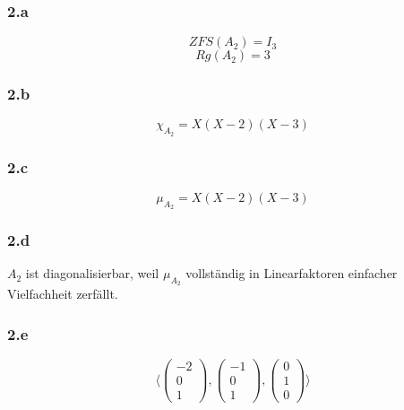 \documentclass[10pt,a4paper]{article}
\begin{document}
\subsubsection*{2.a}

\begin{equation}
ZFS(A_{2}) = I_{3}
\end{equation}
\begin{equation}
Rg(A_{2}) = 3
\end{equation}

\subsubsection*{2.b}

\begin{equation}
\chi_{A_{2}} = X(X-2)(X-3)
\end{equation}

\subsubsection*{2.c}

\begin{equation}
\mu_{A_{2}} = X(X-2)(X-3)
\end{equation}

\subsubsection*{2.d}

$A_{2}$ ist diagonalisierbar, weil $\mu_{A_{2}}$ vollständig in Linearfaktoren einfacher Vielfachheit zerfällt.

\subsubsection*{2.e}

\begin{equation}
\langle
\begin{pmatrix}
-2\\0\\1
\end{pmatrix},
\begin{pmatrix}
-1\\0\\1
\end{pmatrix},
\begin{pmatrix}
0\\1\\0
\end{pmatrix}
\rangle
\end{equation}
\end{document}
